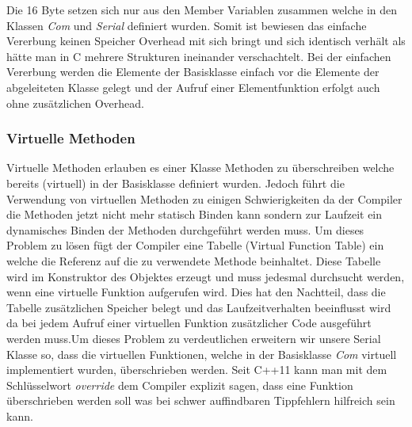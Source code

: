 \documentclass[MES,Master,ngerman]{twbook}%
\begin{document}
Die 16 Byte setzen sich nur aus den Member Variablen zusammen welche in den Klassen \textit{Com} und \textit{Serial} definiert wurden. Somit ist bewiesen das einfache Vererbung keinen Speicher Overhead mit sich bringt und sich identisch verhält als hätte man in C mehrere Strukturen ineinander verschachtelt. Bei der einfachen Vererbung werden die Elemente der Basisklasse einfach vor die Elemente der abgeleiteten Klasse gelegt und der Aufruf einer Elementfunktion erfolgt auch ohne zusätzlichen Overhead.   \newpage


\subsubsection{Virtuelle Methoden}
Virtuelle Methoden erlauben es einer Klasse Methoden zu überschreiben welche bereits (virtuell) in der Basisklasse definiert wurden. Jedoch führt die Verwendung von virtuellen Methoden zu einigen Schwierigkeiten da der Compiler die Methoden jetzt nicht mehr statisch Binden kann sondern zur Laufzeit ein dynamisches Binden der Methoden durchgeführt werden muss. Um dieses Problem zu lösen fügt der Compiler eine Tabelle (Virtual Function Table) ein welche die Referenz auf die zu verwendete Methode beinhaltet. Diese Tabelle wird im Konstruktor des Objektes erzeugt und muss jedesmal durchsucht werden, wenn eine virtuelle Funktion aufgerufen wird. Dies hat den Nachtteil, dass die Tabelle zusätzlichen Speicher belegt und das Laufzeitverhalten beeinflusst wird da bei jedem Aufruf einer virtuellen Funktion zusätzlicher Code ausgeführt werden muss.\newline Um dieses Problem zu verdeutlichen erweitern wir unsere Serial Klasse so, dass die virtuellen Funktionen, welche in der Basisklasse \textit{Com} virtuell implementiert wurden, überschrieben werden. Seit C++11 kann man mit dem Schlüsselwort \textit{override} dem Compiler explizit sagen, dass eine Funktion überschrieben werden soll was bei schwer auffindbaren Tippfehlern hilfreich sein kann.

\begin{figure}[!htb]
	\begin{subfigure}[b]{0.5\textwidth}
		
		\label{fig:33}
	\end{subfigure}
	\begin{subfigure}[b]{0.5\textwidth}
		
		\label{fig:34}
	\end{subfigure}
\end{figure}
\newpage
\end{document}

